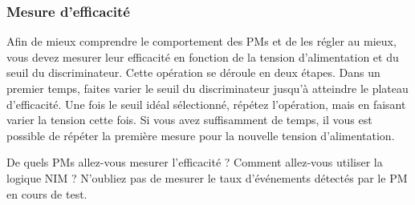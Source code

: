 \subsubsection{Mesure d'efficacité}

Afin de mieux comprendre le comportement des PMs et de les régler au mieux, vous devez mesurer leur efficacité en fonction de la tension d'alimentation et du seuil du discriminateur.
Cette opération se déroule en deux étapes.
Dans un premier temps, faites varier le seuil du discriminateur jusqu'à atteindre le plateau d'efficacité.
Une fois le seuil idéal sélectionné, répétez l'opération, mais en faisant varier la tension cette fois.
Si vous avez suffisamment de temps, il vous est possible de répéter la première mesure pour la nouvelle tension d'alimentation.

\bigskip

De quels PMs allez-vous mesurer l'efficacité ?
Comment allez-vous utiliser la logique NIM ?
N'oubliez pas de mesurer le taux d'événements détectés par le PM en cours de test.



